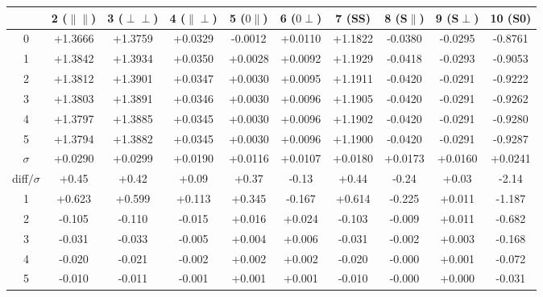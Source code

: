\begin{table}[h!]
     \begin{tabular}{ c c c c c c c c c c}
     & 2 ($\parallel\parallel$) & 3 ($\perp\perp$) & 4 ($\parallel\perp$) & 5 ($0\parallel$) & 
     6 ($0\perp$) & 7 (SS) & 8 (S$\parallel$) & 9 (S$\perp$) & 10 (S0) \\
    \hline
      0 & +1.3666 & +1.3759 & +0.0329 & -0.0012 & +0.0110 & +1.1822 & -0.0380 & -0.0295 & -0.8761\\
      1 & +1.3842 & +1.3934 & +0.0350 & +0.0028 & +0.0092 & +1.1929 & -0.0418 & -0.0293 & -0.9053\\
      2 & +1.3812 & +1.3901 & +0.0347 & +0.0030 & +0.0095 & +1.1911 & -0.0420 & -0.0291 & -0.9222\\
      3 & +1.3803 & +1.3891 & +0.0346 & +0.0030 & +0.0096 & +1.1905 & -0.0420 & -0.0291 & -0.9262\\
      4 & +1.3797 & +1.3885 & +0.0345 & +0.0030 & +0.0096 & +1.1902 & -0.0420 & -0.0291 & -0.9280\\
      5 & +1.3794 & +1.3882 & +0.0345 & +0.0030 & +0.0096 & +1.1900 & -0.0420 & -0.0291 & -0.9287\\
     \hline
      $\sigma$ & +0.0290 & +0.0299 & +0.0190 & +0.0116 & +0.0107 & +0.0180 & +0.0173 & +0.0160 & +0.0241\\
     diff$/\sigma$& +0.45  & +0.42  & +0.09  & +0.37  & -0.13  & +0.44  & -0.24  & +0.03  & -2.14 \\
     \hline
      1 & +0.623  & +0.599  & +0.113  & +0.345  & -0.167  & +0.614  & -0.225  & +0.011  & -1.187 \\
      2 & -0.105  & -0.110  & -0.015  & +0.016  & +0.024  & -0.103  & -0.009  & +0.011  & -0.682 \\
      3 & -0.031  & -0.033  & -0.005  & +0.004  & +0.006  & -0.031  & -0.002  & +0.003  & -0.168 \\
      4 & -0.020  & -0.021  & -0.002  & +0.002  & +0.002  & -0.020  & -0.000  & +0.001  & -0.072 \\
      5 & -0.010  & -0.011  & -0.001  & +0.001  & +0.001  & -0.010  & -0.000  & +0.000  & -0.031 \\  
     \end{tabular}
     \label{tab:norm_weights_evolution_1}
\end{table}
